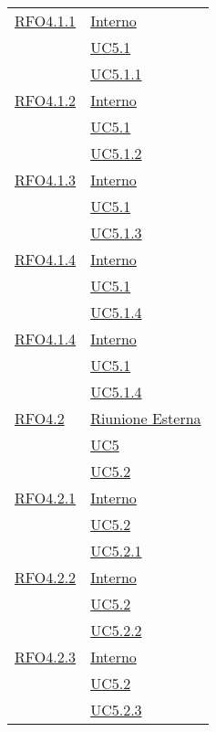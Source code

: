 \begin{longtable}{|>{\centering}m{5cm}|m{5cm}<{\centering}|}
\hyperlink{RFO4.1.1}{RFO4.1.1} & \hyperlink{Interno}{Interno}\\ &\hyperref[UC5.1]{UC5.1}\\ &\hyperref[UC5.1.1]{UC5.1.1}\\ \hline

\hyperlink{RFO4.1.2}{RFO4.1.2} &  \hyperlink{Interno}{Interno}\\ &\hyperref[UC5.1]{UC5.1}\\ &\hyperref[UC5.1.2]{UC5.1.2}\\ \hline

\hyperlink{RFO4.1.3}{RFO4.1.3} & \hyperlink{Interno}{Interno}\\ &\hyperref[UC5.1]{UC5.1}\\ &\hyperref[UC5.1.3]{UC5.1.3}\\ \hline

\hyperlink{RFO4.1.4}{RFO4.1.4} & \hyperlink{Interno}{Interno}\\ &\hyperref[UC5.1]{UC5.1}\\ &\hyperref[UC5.1.4]{UC5.1.4}\\ \hline

\hyperlink{RFO4.1.4}{RFO4.1.4} &\hyperlink{Interno}{Interno}\\ &\hyperref[UC5.1]{UC5.1}\\ &\hyperref[UC5.1.4]{UC5.1.4}\\ \hline

\hyperlink{RFO4.2}{RFO4.2} & \hyperlink{Riunione Esterna}{Riunione Esterna}\\ &\hyperref[UC5]{UC5}\\ &\hyperref[UC5.2]{UC5.2}\\ \hline

\hyperlink{RFO4.2.1}{RFO4.2.1} & \hyperlink{Interno}{Interno}\\ &\hyperref[UC5.2]{UC5.2}\\ &\hyperref[UC5.2.1]{UC5.2.1}\\ \hline

\hyperlink{RFO4.2.2}{RFO4.2.2} &  \hyperlink{Interno}{Interno}\\ &\hyperref[UC5.2]{UC5.2}\\ &\hyperref[UC5.2.2]{UC5.2.2}\\ \hline

\hyperlink{RFO4.2.3}{RFO4.2.3} & \hyperlink{Interno}{Interno}\\ &\hyperref[UC5.2]{UC5.2}\\ &\hyperref[UC5.2.3]{UC5.2.3}\\ \hline


\end{longtable}
